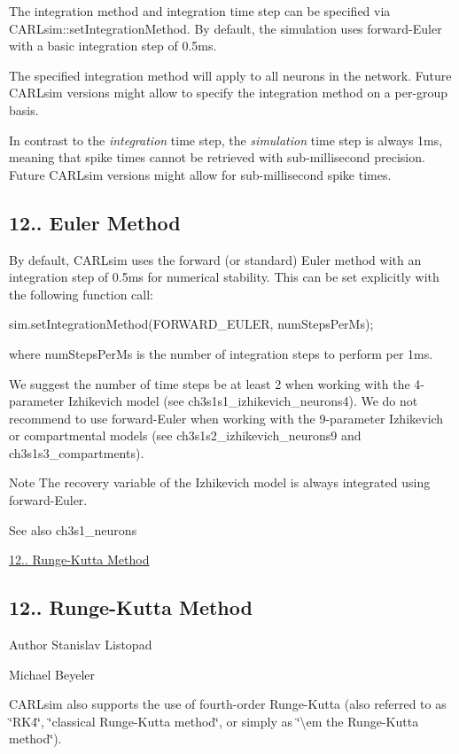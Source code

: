 The integration method and integration time step can be specified via C\+A\+R\+Lsim\+::set\+Integration\+Method. By default, the simulation uses forward-\/\+Euler with a basic integration step of 0.\+5ms.

The specified integration method will apply to all neurons in the network. Future C\+A\+R\+Lsim versions might allow to specify the integration method on a per-\/group basis.

In contrast to the {\itshape integration} time step, the {\itshape simulation} time step is always 1ms, meaning that spike times cannot be retrieved with sub-\/millisecond precision. Future C\+A\+R\+Lsim versions might allow for sub-\/millisecond spike times.\hypertarget{ch12_advanced_topics_ch12s2s1_euler}{}\subsection{12.. Euler Method}\label{ch12_advanced_topics_ch12s2s1_euler}
By default, C\+A\+R\+Lsim uses the forward (or standard) Euler method with an integration step of 0.\+5ms for numerical stability. This can be set explicitly with the following function call\+:


\begin{DoxyCode}
sim.setIntegrationMethod(FORWARD\_EULER, numStepsPerMs);
\end{DoxyCode}


where {\ttfamily num\+Steps\+Per\+Ms} is the number of integration steps to perform per 1ms.

We suggest the number of time steps be at least 2 when working with the 4-\/parameter Izhikevich model (see ch3s1s1\+\_\+izhikevich\+\_\+neurons4). We do not recommend to use forward-\/\+Euler when working with the 9-\/parameter Izhikevich or compartmental models (see ch3s1s2\+\_\+izhikevich\+\_\+neurons9 and ch3s1s3\+\_\+compartments).

\begin{DoxyNote}{Note}
The recovery variable of the Izhikevich model is always integrated using forward-\/\+Euler. 
\end{DoxyNote}
\begin{DoxySeeAlso}{See also}
ch3s1\+\_\+neurons 

\hyperlink{ch12_advanced_topics_ch12s2s2_RK4}{12.. Runge-\/\+Kutta Method}
\end{DoxySeeAlso}
\hypertarget{ch12_advanced_topics_ch12s2s2_RK4}{}\subsection{12.. Runge-\/\+Kutta Method}\label{ch12_advanced_topics_ch12s2s2_RK4}
\begin{DoxyAuthor}{Author}
Stanislav Listopad 

Michael Beyeler
\end{DoxyAuthor}
C\+A\+R\+Lsim also supports the use of fourth-\/order Runge-\/\+Kutta (also referred to as \char`\"{}\+R\+K4\char`\"{}, \char`\"{}classical Runge-\/\+Kutta method\char`\"{}, or simply as \char`\"{}\textbackslash{}em the Runge-\/\+Kutta method\char`\"{}).

